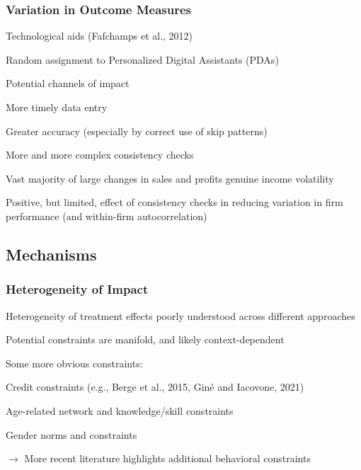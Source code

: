 \documentclass[hideothersubsections, usenames,dvipsnames,11pt]{beamer}
\newenvironment{itemize_2pt}{\itemize\addtolength{\itemsep}{2pt}}{\enditemize}
\newenvironment{enumerate_2pt}{\enumerate\addtolength{\itemsep}{2pt}}{\endenumerate}
\begin{document}

\begin{frame}
\frametitle{Variation in Outcome Measures}
Technological aids \textcolor{camel}{(Fafchamps et al., 2012)}
	\begin{itemize_2pt}
	\item Random assignment to Personalized Digital Assistants (PDAs)
	\
	\item Potential channels of impact
	\begin{enumerate_2pt}
		\item More timely data entry
		\item Greater accuracy (especially by correct use of skip patterns)
		\item More and more complex consistency checks
	
	\end{enumerate_2pt}
	
	\vspace{0.5em}	
	
	\item \textcolor{bdf}{Vast majority of large changes in sales and profits genuine income volatility}
	\item Positive, but limited, effect of consistency checks in reducing variation in firm performance (and within-firm autocorrelation)	
	
	\end{itemize_2pt}
\end{frame}


\subsection{Mechanisms}

\begin{frame}
\frametitle{Heterogeneity of Impact}

Heterogeneity of treatment effects poorly understood across different approaches
\begin{itemize_2pt}
	\item Potential constraints are manifold, and likely context-dependent
	
\vspace{0.5em}	
	
	\item Some more obvious constraints:
	\begin{itemize_2pt}
		\item \textcolor{bdf}{Credit constraints} (e.g., Berge et al., 2015, Gin\'e and Iacovone, 2021)
		\item \textcolor{bdf}{Age-related} network and knowledge/skill \textcolor{bdf}{constraints}
		\item \textcolor{bdf}{Gender norms and constraints}
	\end{itemize_2pt} 
	
	\vspace{1.0em}

	$\rightarrow$ More recent literature highlights additional \textcolor{bdf}{behavioral constraints}	
	
\end{itemize_2pt}
	

\end{frame}
\end{document}
